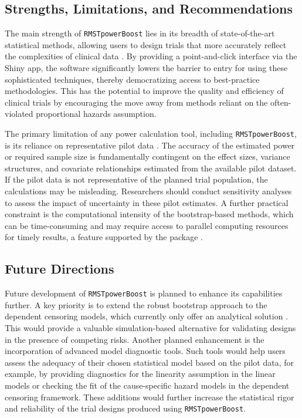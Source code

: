\documentclass[11pt, a4paper]{article}
\begin{document}
\subsection{Strengths, Limitations, and Recommendations}
The main strength of \texttt{RMSTpowerBoost} lies in its breadth of state-of-the-art statistical methods, allowing users to design trials that more accurately reflect the complexities of clinical data \cite{[1]}. By providing a point-and-click interface via the Shiny app, the software significantly lowers the barrier to entry for using these sophisticated techniques, thereby democratizing access to best-practice methodologies. This has the potential to improve the quality and efficiency of clinical trials by encouraging the move away from methods reliant on the often-violated proportional hazards assumption.

The primary limitation of any power calculation tool, including \texttt{RMSTpowerBoost}, is its reliance on representative pilot data \cite{[1]}. The accuracy of the estimated power or required sample size is fundamentally contingent on the effect sizes, variance structures, and covariate relationships estimated from the available pilot dataset. If the pilot data is not representative of the planned trial population, the calculations may be misleading. Researchers should conduct sensitivity analyses to assess the impact of uncertainty in these pilot estimates. A further practical constraint is the computational intensity of the bootstrap-based methods, which can be time-consuming and may require access to parallel computing resources for timely results, a feature supported by the package \cite{[1]}.

\subsection{Future Directions}
Future development of \texttt{RMSTpowerBoost} is planned to enhance its capabilities further. A key priority is to extend the robust bootstrap approach to the dependent censoring models, which currently only offer an analytical solution \cite{[1]}. This would provide a valuable simulation-based alternative for validating designs in the presence of competing risks. Another planned enhancement is the incorporation of advanced model diagnostic tools. Such tools would help users assess the adequacy of their chosen statistical model based on the pilot data, for example, by providing diagnostics for the linearity assumption in the linear models or checking the fit of the cause-specific hazard models in the dependent censoring framework. These additions would further increase the statistical rigor and reliability of the trial designs produced using \texttt{RMSTpowerBoost}.
\end{document}
